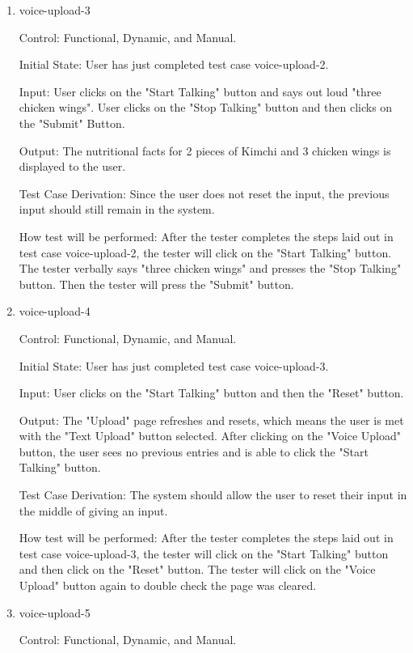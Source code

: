 \documentclass[12pt, titlepage]{article}
\begin{document}
\begin{enumerate}
	\item{voice-upload-3\\}
	
	Control: Functional, Dynamic, and Manual.
	
	Initial State: User has just completed test case voice-upload-2.
	
	Input: User clicks on the "Start Talking" button and says out loud "three chicken wings". User clicks on the "Stop Talking" button and then clicks on the "Submit" Button.
	
	Output: The nutritional facts for 2 pieces of Kimchi and 3 chicken wings is displayed to the user.
	
	Test Case Derivation: Since the user does not reset the input, the previous input should still remain in the system.
	
	How test will be performed: After the tester completes the steps laid out in test case voice-upload-2, the tester will click on the "Start Talking" button. The tester verbally says "three chicken wings" and presses the "Stop Talking" button. Then the tester will press the "Submit" button.
	
	\item{voice-upload-4\\}
	
	Control: Functional, Dynamic, and Manual.
	
	Initial State: User has just completed test case voice-upload-3.
	
	Input: User clicks on the "Start Talking" button and then the "Reset" button.
	
	Output: The "Upload" page refreshes and resets, which means the user is met with the "Text Upload" button selected. After clicking on the "Voice Upload" button, the user sees no previous entries and is able to click the "Start Talking" button.
	
	Test Case Derivation: The system should allow the user to reset their input in the middle of giving an input.
	
	How test will be performed: After the tester completes the steps laid out in test case voice-upload-3, the tester will click on the "Start Talking" button and then click on the "Reset" button. The tester will click on the "Voice Upload" button again to double check the page was cleared.
	
	\item{voice-upload-5\\}
	
	Control: Functional, Dynamic, and Manual.
	

\end{enumerate}
\end{document}
